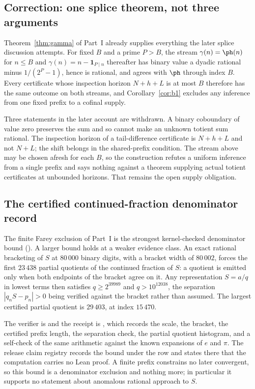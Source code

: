 \subsection{Correction: one splice theorem, not three arguments}
\label{ssec:splice-correction}

Theorem~\ref{thm:gamma} of Part~I already supplies everything the later
splice discussion attempts. For fixed $B$ and a prime $P>B$, the stream
$\gamma(n)=\ph(n)$ for $n\le B$ and $\gamma(n)=n-\mathbf1_{P\mid n}$
thereafter has binary value a dyadic rational minus $1/(2^P-1)$, hence is
rational, and agrees with $\ph$ through index $B$. Every certificate whose
inspection horizon $N+h+L$ is at most $B$ therefore has the same outcome on
both streams, and Corollary~\ref{cor:b1} excludes any inference from one fixed
prefix to a cofinal supply.

Three statements in the later account are withdrawn. A binary coboundary of
value zero preserves the sum and so cannot make an unknown totient sum
rational. The inspection horizon of a tail-difference certificate is
$N+h+L$ and not $N+L$; the shift belongs in the shared-prefix condition.
The stream above may be chosen afresh for each $B$, so the construction
refutes a uniform inference from a single prefix and says nothing against a
theorem supplying actual totient certificates at unbounded horizons. That
remains the open supply obligation. 

\subsection{The certified continued-fraction denominator record}
\label{ssec:cf-record}

The finite Farey exclusion of Part~I is the strongest kernel-checked
denominator bound
().
A larger bound holds at a weaker evidence class. An exact rational bracketing
of $S$ at $80\,000$ binary digits, with a bracket width of $80\,002$, forces
the first $23\,438$ partial quotients of the continued fraction of $S$: a
quotient is emitted only when both endpoints of the bracket agree on it. Any
representation $S=a/q$ in lowest terms then satisfies $q\ge2^{39989}$ and
$q>10^{12038}$, the separation $|q_nS-p_n|>0$ being verified against the
bracket rather than assumed. The largest certified partial quotient is
$29\,403$, at index $15\,470$. 

The verifier is  and the receipt is
, which records the scale, the
bracket, the certified prefix length, the separation check, the partial
quotient histogram, and a self-check of the same arithmetic against the known
expansions of $e$ and $\pi$. The release claim registry records the bound
under the row  and states there that the
computation carries no Lean proof. A finite prefix constrains no later
convergent, so this bound is a denominator exclusion and nothing more; in
particular it supports no statement about anomalous rational approach to $S$.
  

